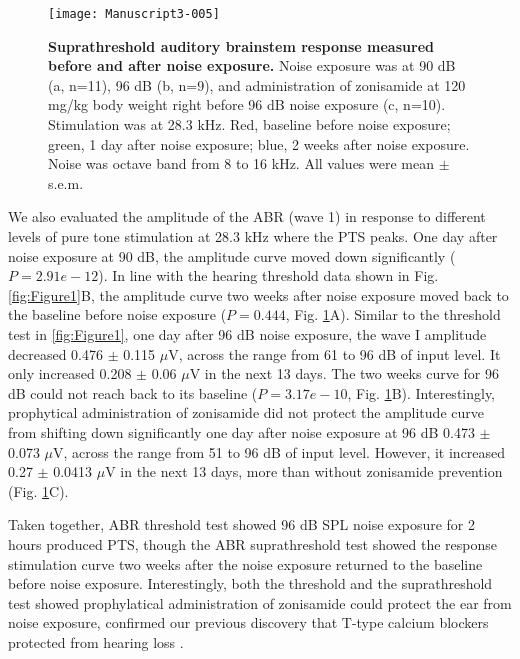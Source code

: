 \documentclass[11pt]{article}
\begin{document}
\begin{figure}[ht]
\centering
\texttt{[image: Manuscript3-005]}

\caption{{\bf {Suprathreshold auditory brainstem response measured before and after noise exposure.}}  Noise exposure was at 90 dB (a, n=11), 96 dB (b, n=9), and administration of zonisamide at 120 mg/kg body weight right before 96 dB noise exposure (c, n=10). Stimulation was at 28.3 kHz.  Red, baseline before noise exposure; green, 1 day after noise exposure; blue, 2 weeks after noise exposure.  Noise was octave band from 8 to 16 kHz. All values were mean $\pm$ s.e.m.}
\label{fig:Figure2}
\end{figure}

We also evaluated the amplitude of the ABR (wave 1) in response to different levels of pure tone stimulation at 28.3 kHz where the PTS peaks. One day after noise exposure at 90 dB, the amplitude curve moved down significantly ($P=2.91e-12$). In line with the hearing threshold data shown in Fig. \ref{fig:Figure1}B, the amplitude curve two weeks after noise exposure moved back to the baseline before noise exposure 
($P=0.444$, Fig. \ref{fig:Figure2}A). Similar to the threshold test in \ref{fig:Figure1}, one day after 96 dB noise exposure, the wave I amplitude decreased 0.476 
$\pm$ 
0.115 $\mu$V, across the range from 61 to 96 dB of input level. It only increased 0.208 
$\pm$ 
0.06 $\mu$V in the next 13 days. The two weeks curve for 96 dB could not reach back to its baseline 
($P=3.17e-10$, Fig. \ref{fig:Figure2}B). Interestingly, prophytical administration of zonisamide did not protect the amplitude curve from shifting down significantly one day after noise exposure at 96 dB 0.473 
$\pm$ 
0.073 $\mu$V, across the range from 51 to 96 dB of input level. However, it increased 0.27 
$\pm$ 
0.0413 $\mu$V in the next 13 days, more than without zonisamide prevention (Fig. \ref{fig:Figure2}C).

Taken together, ABR threshold test showed 96 dB SPL noise exposure for 2 hours produced PTS, though the ABR suprathreshold test showed the response stimulation curve two weeks after the noise exposure returned to the baseline before noise exposure. Interestingly, both the threshold and the suprathreshold test showed prophylatical administration of zonisamide could protect the ear from noise exposure, confirmed our previous discovery that T-type calcium blockers protected from hearing loss \cite{Shen2007,Lei2011}.
\end{document}
